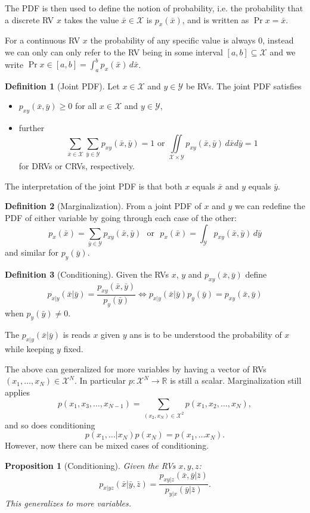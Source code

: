 \documentclass[margin=tiny]{hsrzf}
\theoremstyle{plain}
\newtheorem{prop}{Proposition}[section]
\theoremstyle{definition}
\newtheorem{defn}{Definition}[section]
\theoremstyle{remark}
\begin{document}
The PDF is then used to define the notion of probability, i.e. the probability
that a discrete RV $x$ takes the value $\bar{x} \in \mathcal{X}$ is
$p_x(\bar{x})$, and is written as $\Pr{x = \bar{x}}$.

For a continuous RV $x$ the probability of any specific value is always 0,
instead we can only can only refer to the RV being in some interval $[a,b]
\subseteq \mathcal{X}$ and we write $\Pr{x \in [a,b]} = \int_a^b p_x(\bar{x})
\,d\bar{x}$.

\begin{defn}[Joint PDF]
  Let $x \in \mathcal{X}$ and $y \in \mathcal{Y}$ be RVs. The joint PDF
  satisfies
  \begin{itemize}
    \item $p_{xy}(\bar{x}, \bar{y}) \geq 0$ for all $x \in\mathcal{X}$ and $y
      \in \mathcal{Y}$,
    \item further
      \[
        \sum_{\bar{x}\in\mathcal{X}}\sum_{\bar{y}\in\mathcal{Y}}
        p_{xy}(\bar{x}, \bar{y}) = 1
        \text{ or }
        \iint\limits_{\mathcal{X}\times\mathcal{Y}} p_{xy}(\bar{x}, \bar{y})
        \,d\bar{x}d\bar{y} = 1
      \]
      for DRVs or CRVs, respectively.
  \end{itemize}
\end{defn}

The interpretation of the joint PDF is that both $x$ equals $\bar{x}$ and $y$
equals $\bar{y}$.

\begin{defn}[Marginalization]
  From a joint PDF of $x$ and $y$ we can redefine the PDF of either variable
  by going through each case of the other:
  \[
    p_x(\bar{x}) = \sum_{\bar{y} \in \mathcal{Y}} p_{xy} (\bar{x}, \bar{y})
    \text{~~or~~}
    p_x(\bar{x}) = \int_\mathcal{Y} p_{xy} (\bar{x}, \bar{y}) \,
    d\bar{y}
  \]
  and similar for $p_y(\bar{y})$.
\end{defn}

\begin{defn}[Conditioning]
  Given the RVs $x$, $y$ and $p_{xy}(\bar{x}, \bar{y})$ define
  \[
    p_{x|y}(\bar{x} | \bar{y}) = \frac{p_{xy}(\bar{x}, \bar{y})}{p_y(\bar{y})}
    \iff
    p_{x|y}(\bar{x} | \bar{y}) p_y(\bar{y}) = p_{xy}(\bar{x}, \bar{y})
  \]
  when $p_y(\bar{y}) \neq 0$.
\end{defn}

The $p_{x|y}(\bar{x} | \bar{y})$ is reads $x$ given $y$ ans is to be
understood the probability of $x$ while keeping $y$ fixed.

The above can generalized for more variables by having a vector of RVs
$(x_1,\ldots, x_N) \in \mathcal{X}^N$. In particular $p : \mathcal{X}^N \to
\mathbb{R}$ is still a scalar. Marginalization still applies
\[
  p(x_1, x_3, \ldots, x_{N-1}) = \sum_{(x_{2}, x_{N}) \in \mathcal{X}^2}
  p(x_1, x_2, \ldots, x_N),
\]
and so does conditioning
\[
  p(x_1, \ldots | x_N) p(x_N) = p(x_1, \ldots x_N).
\]
However, now there can be mixed cases of conditioning.
\begin{prop}[Conditioning]
  Given the RVs $x, y, z$:
  \[
    p_{x|yz}(\bar{x} | \bar{y}, \bar{z}) = 
      \frac{p_{xy|z}(\bar{x},\bar{y} | \bar{z})}{p_{y|x}(\bar{y} | \bar{z})}.
  \]
  This generalizes to more variables.
\end{prop}
\end{document}
